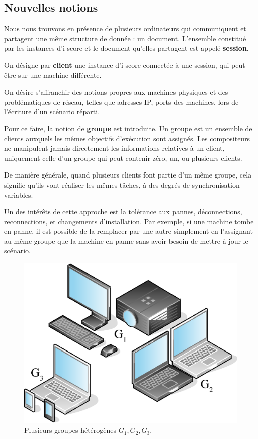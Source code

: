 \documentclass[10pt]{article}
\newcommand\vocab[1]{\textbf{#1}}
\begin{document}

\subsection{Nouvelles notions}
Nous nous trouvons en présence de plusieurs ordinateurs qui communiquent et partagent une même structure de donnée : un document.
L'ensemble constitué par les instances d'i-score et le document qu'elles partagent est appelé \vocab{session}.

On désigne par \vocab{client} une instance d'i-score connectée à une session, qui peut être sur une machine différente.

On désire s'affranchir des notions propres aux machines physiques et des problématiques de réseau, telles que adresses IP, ports des machines, lors de l'écriture d'un scénario réparti. 

Pour ce faire, la notion de \vocab{groupe} est introduite. 
Un groupe est un ensemble de clients auxquels les mêmes objectifs d'exécution sont assignés.
Les compositeurs ne manipulent jamais directement les informations relatives à un client, uniquement celle d'un groupe qui peut contenir zéro, un, ou plusieurs clients.

De manière générale, quand plusieurs clients font partie d'un même groupe, cela signifie qu'ils vont réaliser les mêmes tâches, à des degrés de synchronisation variables.

Un des intérêts de cette approche est la tolérance aux pannes, déconnections, reconnections, et changements d'installation. 
Par exemple, si une machine tombe en panne, il est possible de la remplacer par une autre simplement en l'assignant au même groupe que la machine en panne 
sans avoir besoin de mettre à jour le scénario.


\begin{figure}[h]
	\centering
	\includegraphics[scale=0.4]{images/groupes.eps}
	\caption{Plusieurs groupes hétérogènes $G_1,G_2,G_3$.}
	\label{img.groupes}
\end{figure}
\end{document}
